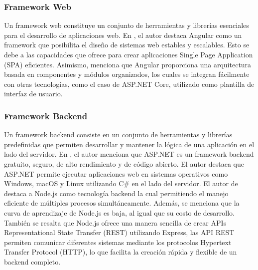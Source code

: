 \subsubsection{Framework Web}
Un framework web constituye un conjunto de herramientas y librerías esenciales para el desarrollo de aplicaciones web.
En \cite{chicaizavillegasAplicacionWebPara2023}, el autor destaca Angular como un framework que posibilita el diseño
de sistemas web estables y escalables. Esto se debe a las capacidades que ofrece para crear aplicaciones Single Page Application (SPA) eficientes.
Asimismo, menciona que Angular proporciona una arquitectura basada en componentes y módulos organizados, los cuales se
integran fácilmente con otras tecnologías, como el caso de ASP.NET Core, utilizado como plantilla de interfaz de usuario.

\subsubsection{Framework Backend}
Un framework backend consiste en un conjunto de herramientas y librerías predefinidas que permiten desarrollar y mantener
la lógica de una aplicación en el lado del servidor. En \cite{chicaizavillegasAplicacionWebPara2023}, el autor menciona
que ASP.NET es un framework backend gratuito, seguro, de alto rendimiento y de código abierto. El autor destaca que ASP.NET
permite ejecutar aplicaciones web en sistemas operativos como Windows, macOS y Linux utilizando C\# en el lado del servidor.
El autor de \cite{chasichangoAplicacionMovilApoyo2022} destaca a Node.js como tecnología backend  la cual permitiendo el
manejo eficiente de múltiples procesos simultáneamente. Además, se menciona que la curva de aprendizaje de Node.js es
baja, al igual que su costo de desarrollo. También se resalta que Node.js ofrece una manera sencilla de crear APIs Representational State Transfer (REST)
utilizando Express, las API REST permiten comunicar diferentes sistemas mediante los protocolos Hypertext Transfer Protocol (HTTP), lo que facilita
la creación rápida y flexible de un backend completo.

